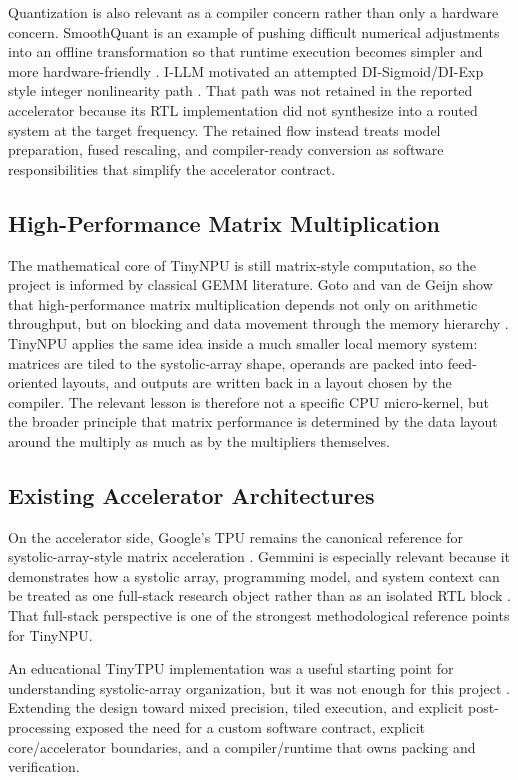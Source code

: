 \documentclass[a4paper, 12pt, titlepage]{article}
\begin{document}
Quantization is also relevant as a compiler concern rather than only a hardware concern. SmoothQuant is an example of pushing difficult numerical adjustments into an offline transformation so that runtime execution becomes simpler and more hardware-friendly \cite{xiao2023smoothquant}. I-LLM motivated an attempted DI-Sigmoid/DI-Exp style integer nonlinearity path \cite{hu2024illm}. That path was not retained in the reported accelerator because its RTL implementation did not synthesize into a routed system at the target frequency. The retained flow instead treats model preparation, fused rescaling, and compiler-ready conversion as software responsibilities that simplify the accelerator contract.

\subsection{High-Performance Matrix Multiplication}
The mathematical core of TinyNPU is still matrix-style computation, so the project is informed by classical GEMM literature. Goto and van de Geijn show that high-performance matrix multiplication depends not only on arithmetic throughput, but on blocking and data movement through the memory hierarchy \cite{goto2008anatomy}. TinyNPU applies the same idea inside a much smaller local memory system: matrices are tiled to the systolic-array shape, operands are packed into feed-oriented layouts, and outputs are written back in a layout chosen by the compiler. The relevant lesson is therefore not a specific CPU micro-kernel, but the broader principle that matrix performance is determined by the data layout around the multiply as much as by the multipliers themselves.

\subsection{Existing Accelerator Architectures}
On the accelerator side, Google's TPU remains the canonical reference for systolic-array-style matrix acceleration \cite{jouppi2017datacenter}. Gemmini is especially relevant because it demonstrates how a systolic array, programming model, and system context can be treated as one full-stack research object rather than as an isolated RTL block \cite{genc2021gemmini}. That full-stack perspective is one of the strongest methodological reference points for TinyNPU.

An educational TinyTPU implementation was a useful starting point for understanding systolic-array organization, but it was not enough for this project \cite{chin2025tinytpu}. Extending the design toward mixed precision, tiled execution, and explicit post-processing exposed the need for a custom software contract, explicit core/accelerator boundaries, and a compiler/runtime that owns packing and verification.
\end{document}
